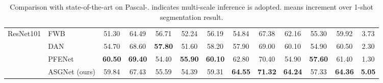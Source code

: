 \begin{table*}[htbp]
\begin{center}
\begin{tabular}{|l|l|ccccc|ccccc|c|}
\multirow{4}{*}{ResNet101}      & FWB \cite{fwb}                    & 51.30          & 64.49 & 56.71 & 52.24          & 56.19                               & 54.84          & 67.38          & 62.16          & 55.30          & 59.92                               & 3.73 \\
& DAN \cite{danet}                    & 54.70          & 68.60 & \textbf{57.80} & 51.60          & 58.20                               & 57.90          & 69.00          & 60.10          & 54.90          & 60.50                               & 2.30 \\
& PFENet \cite{pfenet}       & \textbf{60.50}          & \textbf{69.40} & 54.40 & \textbf{55.90}          & \textbf{60.10}                    & 62.80          & 70.40          & 54.90          & \textbf{57.60}          & 61.40                               &  1.30 \\
& ASGNet (ours)  & 59.84 & 67.43          & 55.59          & 54.39 & 59.31 & \textbf{64.55} & \textbf{71.32} & \textbf{64.24} & 57.33 & \textbf{64.36} & \textbf{5.05}                      \\ \hline

\end{tabular}
\end{center}
\caption{Comparison with state-of-the-art on Pascal-.  indicates multi-scale inference is adopted.  means increment over 1-shot segmentation result.}
\vspace{-3mm}
\label{pascal}
\end{table*}

